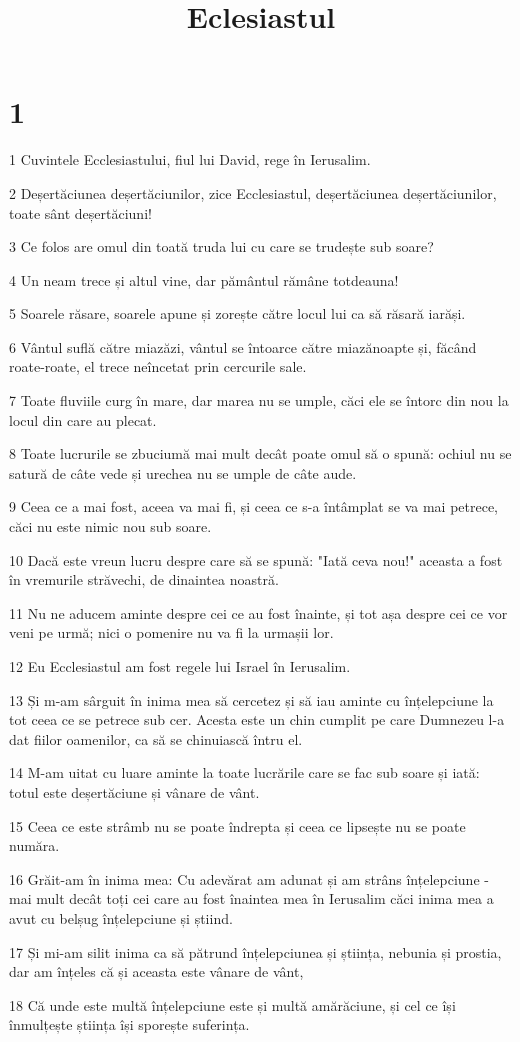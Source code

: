 

\title{Eclesiastul}


\chapter{1}

\par 1 Cuvintele Ecclesiastului, fiul lui David, rege în Ierusalim.
\par 2 Deșertăciunea deșertăciunilor, zice Ecclesiastul, deșertăciunea deșertăciunilor, toate sânt deșertăciuni!
\par 3 Ce folos are omul din toată truda lui cu care se trudește sub soare?
\par 4 Un neam trece și altul vine, dar pământul rămâne totdeauna!
\par 5 Soarele răsare, soarele apune și zorește către locul lui ca să răsară iarăși.
\par 6 Vântul suflă către miazăzi, vântul se întoarce către miazănoapte și, făcând roate-roate, el trece neîncetat prin cercurile sale.
\par 7 Toate fluviile curg în mare, dar marea nu se umple, căci ele se întorc din nou la locul din care au plecat.
\par 8 Toate lucrurile se zbuciumă mai mult decât poate omul să o spună: ochiul nu se satură de câte vede și urechea nu se umple de câte aude.
\par 9 Ceea ce a mai fost, aceea va mai fi, și ceea ce s-a întâmplat se va mai petrece, căci nu este nimic nou sub soare.
\par 10 Dacă este vreun lucru despre care să se spună: "Iată ceva nou!" aceasta a fost în vremurile străvechi, de dinaintea noastră.
\par 11 Nu ne aducem aminte despre cei ce au fost înainte, și tot așa despre cei ce vor veni pe urmă; nici o pomenire nu va fi la urmașii lor.
\par 12 Eu Ecclesiastul am fost regele lui Israel în Ierusalim.
\par 13 Și m-am sârguit în inima mea să cercetez și să iau aminte cu înțelepciune la tot ceea ce se petrece sub cer. Acesta este un chin cumplit pe care Dumnezeu l-a dat fiilor oamenilor, ca să se chinuiască întru el.
\par 14 M-am uitat cu luare aminte la toate lucrările care se fac sub soare și iată: totul este deșertăciune și vânare de vânt.
\par 15 Ceea ce este strâmb nu se poate îndrepta și ceea ce lipsește nu se poate număra.
\par 16 Grăit-am în inima mea: Cu adevărat am adunat și am strâns înțelepciune - mai mult decât toți cei care au fost înaintea mea în Ierusalim căci inima mea a avut cu belșug înțelepciune și știind.
\par 17 Și mi-am silit inima ca să pătrund înțelepciunea și știința, nebunia și prostia, dar am înțeles că și aceasta este vânare de vânt,
\par 18 Că unde este multă înțelepciune este și multă amărăciune, și cel ce își înmulțește știința își sporește suferința.

